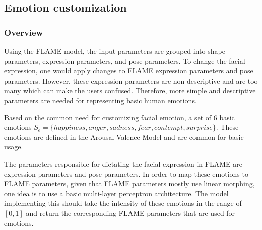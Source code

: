 \subsection{Emotion customization}

\subsubsection{Overview}

Using the FLAME model, the input parameters are grouped into shape parameters, expression parameters, and pose parameters. To change the facial expression, one would apply changes to FLAME expression parameters and pose parameters. However, these expression parameters are non-descriptive and are too many which can make the users confused. Therefore, more simple and descriptive parameters are needed for representing basic human emotions.

Based on the common need for customizing facial emotion, a set of 6 basic emotions $S_e=\{ happiness, anger, sadness, fear, contempt, surprise\}$. These emotions are defined in the Arousal-Valence Model and are common for basic usage.

The parameters responsible for dictating the facial expression in FLAME are expression parameters and pose parameters. In order to map these emotions to FLAME parameters, given that FLAME parameters mostly use linear morphing, one idea is to use a basic multi-layer perceptron architecture. The model implementing this should take the intensity of these emotions in the range of $[0,1]$ and return the corresponding FLAME parameters that are used for emotions.